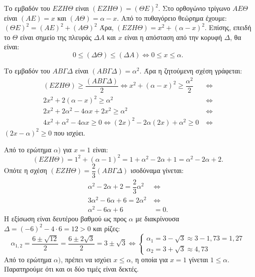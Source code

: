 
\begin{alist}
\item Το εμβαδόν του $EZH\Theta$ είναι $(EZH\Theta) = (\Theta E)^2$. Στο ορθογώνιο τρίγωνο $AE\Theta$ είναι
$(AE) = x$ και $(A\Theta) = \alpha - x$. Από το πυθαγόρειο θεώρημα έχουμε:
$(\Theta E)^2 = (AE)^2 + (A\Theta)^2$
Άρα, $(EZH\Theta) = x^2 + (\alpha - x)^2$.
Επίσης, επειδή το $\Theta$ είναι σημείο της πλευράς $\Delta A$ και $x$ είναι η απόσταση από την κορυφή $\Delta$,
θα είναι:
\[0 \le (\Delta\Theta) \le (\Delta A) \Leftrightarrow 0 \le x \le \alpha.\]

\item Το εμβαδόν του $AB\Gamma\Delta$ είναι $(AB\Gamma\Delta) = \alpha^2$. Άρα η ζητούμενη σχέση γράφεται:
\begin{align*}
(EZH\Theta) \ge \dfrac{(AB\Gamma\Delta)}{2} \Leftrightarrow x^2 + (\alpha - x)^2 \ge \dfrac{\alpha^2}{2} \ &\Leftrightarrow \\
2x^2 + 2(\alpha - x)^2 \ge \alpha^2 \ &\Leftrightarrow \\
2x^2 + 2\alpha^2 - 4\alpha x + 2x^2 \ge \alpha^2 \ &\Leftrightarrow \\
4x^2 + \alpha^2 - 4\alpha x \ge 0 \Leftrightarrow (2x)^2 - 2\alpha(2x) + \alpha^2 \ge 0 \ &\Leftrightarrow
\end{align*}
$(2x - \alpha)^2 \ge 0$ που ισχύει.

\item Από το ερώτημα $\alpha)$ για $x = 1$ είναι:
\[(EZH\Theta) = 1^2 + (\alpha - 1)^2 = 1 + \alpha^2 - 2\alpha + 1 = \alpha^2 - 2\alpha + 2.\]
Οπότε η σχέση $(EZH\Theta) = \dfrac{2}{3}(AB\Gamma\Delta)$ ισοδύναμα γίνεται:
\begin{align*}
\alpha^2 - 2\alpha + 2 = \dfrac{2}{3}\alpha^2 \ &\Leftrightarrow \\
3\alpha^2 - 6\alpha + 6 = 2\alpha^2 \ &\Leftrightarrow \\
\alpha^2 - 6\alpha + 6 &= 0.
\end{align*}
Η εξίσωση είναι δευτέρου βαθμού ως προς $\alpha$ με διακρίνουσα $\Delta = (-6)^2 - 4 \cdot 6 = 12 > 0$ και
ρίζες:
\[\alpha_{1,2} = \dfrac{6 \pm \sqrt{12}}{2} = \dfrac{6 \pm 2\sqrt{3}}{2} = 3 \pm \sqrt{3} \Leftrightarrow \begin{cases} \alpha_1 = 3 - \sqrt{3} \approx 3 - 1,73 = 1,27 \\ \alpha_2 = 3 + \sqrt{3} \approx 4,73 \end{cases}\]
Από το ερώτημα $\alpha)$, πρέπει να ισχύει $x \le \alpha$, η οποία για $x = 1$ γίνεται $1 \le \alpha$.
Παρατηρούμε ότι και οι δύο τιμές είναι δεκτές.
\end{alist}

